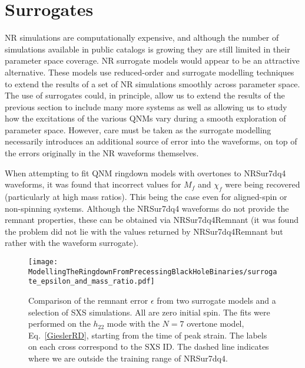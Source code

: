\section{Surrogates}\label{surrogate-section}

NR simulations are computationally expensive, and although the number of simulations available in public catalogs is growing they are still limited in their parameter space coverage. 
NR surrogate models \cite{Blackman:2015pia, Blackman:2017pcm, Varma:2019csw, Varma:2018mmi} would appear to be an attractive alternative.
These models use reduced-order and surrogate modelling techniques to extend the results of a set of NR simulations smoothly across parameter space. 
The use of surrogates could, in principle, allow us to extend the results of the previous section to include many more systems as well as allowing us to study how the excitations of the various QNMs vary during a smooth exploration of parameter space.
However, care must be taken as the surrogate modelling necessarily introduces an additional source of error into the waveforms, on top of the errors originally in the NR waveforms themselves.
 
When attempting to fit QNM ringdown models with overtones to NRSur7dq4 \cite{Varma:2019csw} waveforms, it was found that incorrect values for $M_f$ and $\chi_f$ were being recovered (particularly at high mass ratios). This being the case even for aligned-spin or non-spinning systems. Although the NRSur7dq4 waveforms do not provide the remnant properties, these can be obtained via NRSur7dq4Remnant \cite{Varma:2019csw} (it was found the problem did not lie with the values returned by NRSur7dq4Remnant but rather with the waveform surrogate).

\begin{figure}[t]
    \centering
    \texttt{[image: ModellingTheRingdownFromPrecessingBlackHoleBinaries/surrogate\_epsilon\_and\_mass\_ratio.pdf]}
    \caption[Comparison of the error on measured remnant mass and spin from two surrogate models and a selection of SXS simulations.]{
    Comparison of the remnant error $\epsilon$ from two surrogate models and a selection of SXS simulations. All are zero initial spin. The fits were performed on the $h_{22}$ mode with the $N=7$ overtone model, Eq.~\ref{GieslerRD}, starting from the time of peak strain. The labels on each cross correspond to the SXS ID. The dashed line indicates where we are outside the training range of NRSur7dq4.
    }
    \label{surrogate_epsilon_vs_q}
\end{figure} 

